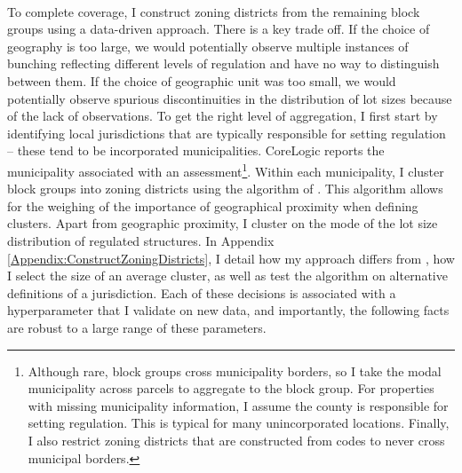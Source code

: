 \documentclass[12pt]{article}
\begin{document}
	 \paragraph*{}
	 To complete coverage, I construct zoning districts from the remaining block groups using a data-driven approach. There is a key trade off. If the choice of geography is too large, we would potentially observe multiple instances of bunching reflecting different levels of regulation and have no way to distinguish between them. If the choice of geographic unit was too small, we would potentially observe spurious discontinuities in the distribution of lot sizes because of the lack of observations. To get the right level of aggregation, I first start by identifying local jurisdictions that are typically responsible for setting regulation -- these tend to be incorporated municipalities. CoreLogic reports the municipality associated with an assessment\footnote{Although rare, block groups cross municipality borders, so I take the modal municipality across parcels to aggregate to the block group. For properties with missing municipality information, I assume the county is responsible for setting regulation. This is typical for many unincorporated locations. Finally, I also restrict zoning districts that are constructed from codes to never cross municipal borders.}. Within each municipality, I cluster block groups into zoning districts using the algorithm of \cite{Chavent2018}. This algorithm allows for the weighing of the importance of geographical proximity when defining clusters. Apart from geographic proximity, I cluster on the mode of the lot size distribution of regulated structures. In Appendix \ref{Appendix:ConstructZoningDistricts}, I detail how my approach differs from \cite{Song}, how I select the size of an average cluster, as well as test the algorithm on alternative definitions of a jurisdiction. Each of these decisions is associated with a hyperparameter that I validate on new data, and importantly, the following facts are robust to a large range of these parameters. 
	 
\end{document}
